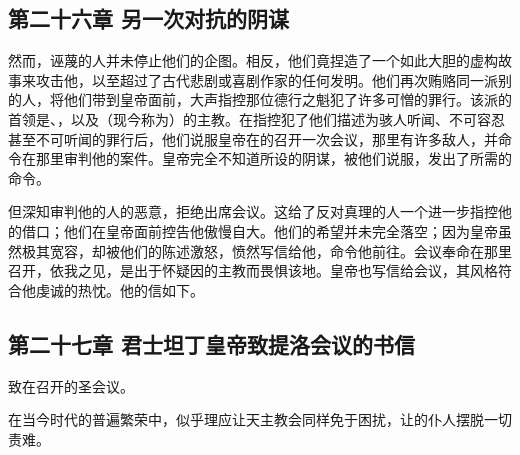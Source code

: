 \par


\subsection{第二十六章 另一次对抗的阴谋}

然而，诬蔑的人并未停止他们的企图。相反，他们竟捏造了一个如此大胆的虚构故事来攻击他，以至超过了古代悲剧或喜剧作家的任何发明。他们再次贿赂同一派别的人，将他们带到皇帝面前，大声指控那位德行之魁犯了许多可憎的罪行。该派的首领是、，以及（现今称为）的主教。在指控犯了他们描述为骇人听闻、不可容忍甚至不可听闻的罪行后，他们说服皇帝在的召开一次会议，那里有许多敌人，并命令在那里审判他的案件。皇帝完全不知道所设的阴谋，被他们说服，发出了所需的命令。\par

但深知审判他的人的恶意，拒绝出席会议。这给了反对真理的人一个进一步指控他的借口；他们在皇帝面前控告他傲慢自大。他们的希望并未完全落空；因为皇帝虽然极其宽容，却被他们的陈述激怒，愤然写信给他，命令他前往。会议奉命在那里召开，依我之见，是出于怀疑因的主教而畏惧该地。皇帝也写信给会议，其风格符合他虔诚的热忱。他的信如下。\par


\subsection{第二十七章 君士坦丁皇帝致提洛会议的书信}

致在召开的圣会议。\par

在当今时代的普遍繁荣中，似乎理应让天主教会同样免于困扰，让的仆人摆脱一切责难。\par

